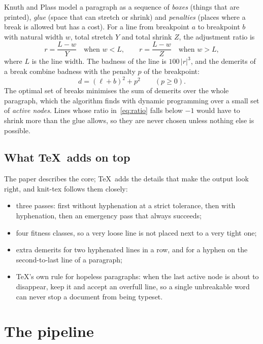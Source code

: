 \documentclass[10pt]{article}
\newcommand{\term}[1]{\emph{#1}}
\begin{document}
Knuth and Plass model a paragraph as a sequence of \term{boxes} (things that
are printed), \term{glue} (space that can stretch or shrink) and
\term{penalties} (places where a break is allowed but has a cost). For a line
from breakpoint $a$ to breakpoint $b$ with natural width $w$, total stretch
$Y$ and total shrink $Z$, the adjustment ratio is
\begin{equation}
  r = \frac{L - w}{Y} \quad\text{when } w < L, \qquad r = \frac{L - w}{Z} \quad\text{when } w > L,
  \label{eq:ratio}
\end{equation}
where $L$ is the line width. The badness of the line is $100\,|r|^3$, and the
demerits of a break combine badness with the penalty $p$ of the breakpoint:
\[
  d = (\ell + b)^2 + p^2 \qquad (p \geq 0).
\]
The optimal set of breaks minimises the sum of demerits over the whole
paragraph, which the algorithm finds with dynamic programming over a small set
of \term{active nodes}. Lines whose ratio in~\eqref{eq:ratio} falls below
$-1$ would have to shrink more than the glue allows, so they are never
chosen unless nothing else is possible.

\subsection{What \TeX\ adds on top}

The paper describes the core; \TeX\ adds the details that make the output look
right, and knit-tex follows them closely:
\begin{itemize}
  \item three passes: first without hyphenation at a strict tolerance, then
        with hyphenation, then an emergency pass that always succeeds;
  \item four fitness classes, so a very loose line is not placed next to a
        very tight one;
  \item extra demerits for two hyphenated lines in a row, and for a
        hyphen on the second-to-last line of a paragraph;
  \item \TeX's own rule for hopeless paragraphs: when the last active node is
        about to disappear, keep it and accept an overfull line, so a single
        unbreakable word can never stop a document from being typeset.
\end{itemize}

\section{The pipeline}
\end{document}
